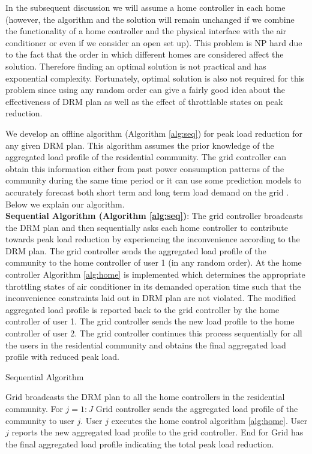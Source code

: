 \documentclass[10pt,twocolumn,twoside]{IEEEtran}
\begin{document}
In the subsequent discussion we will assume a home controller in each home (however, the algorithm and the solution will remain unchanged if we combine the functionality of a home controller and the physical interface with the air conditioner or even if we consider an open set up). This problem is NP hard due to the fact that the order in which different homes are considered affect the solution. Therefore finding an optimal solution is not practical and has exponential complexity. Fortunately, optimal solution is also not required for this problem since using any random order can give a fairly good idea about the effectiveness of DRM plan as well as the effect of throttlable states on peak reduction.

We develop an offline algorithm (Algorithm \ref{alg:seq}) for peak load reduction for any given DRM plan. This algorithm assumes the prior knowledge of the aggregated load profile of the residential community. The grid controller can obtain this information either from past power consumption patterns of the community during the same time period or it can use some prediction models to accurately forecast both short term and long term load demand on the grid \cite{forecast1,forecast4}. 
Below we explain our algorithm.\\
\textbf{Sequential Algorithm (Algorithm \ref{alg:seq})}: The grid controller broadcasts the DRM plan and then sequentially asks each home controller to contribute towards peak load reduction by experiencing the inconvenience according to the DRM plan. The grid controller sends the aggregated load profile of the community to the home controller of user 1 (in any random order). At the home controller Algorithm \ref{alg:home} is implemented which determines the appropriate throttling states of air conditioner in its demanded operation time such that the inconvenience constraints laid out in DRM plan are not violated. The modified aggregated load profile is reported back to the grid controller by the home controller of user 1. The grid controller sends the new load profile to the home controller of user 2. The grid controller continues this process sequentially for all the users in the residential community and obtains the final aggregated load profile with reduced peak load. \\
\begin{algorithm}[htb]
\caption{Sequential Algorithm}
\label{alg:seq}
\begin{algorithmic}[1]
\STATE Grid broadcasts the DRM plan to all the home controllers in the residential community. 
\STATE For $j=1:J$
\STATE Grid controller sends the aggregated load profile of the community to user $j$.
\STATE User $j$ executes the home control algorithm \ref{alg:home}.
\STATE User $j$ reports the new aggregated load profile to the grid controller.
\STATE End for
\STATE Grid has the final aggregated load profile indicating the total peak load reduction.
\end{algorithmic}
\end{algorithm}
\end{document}
